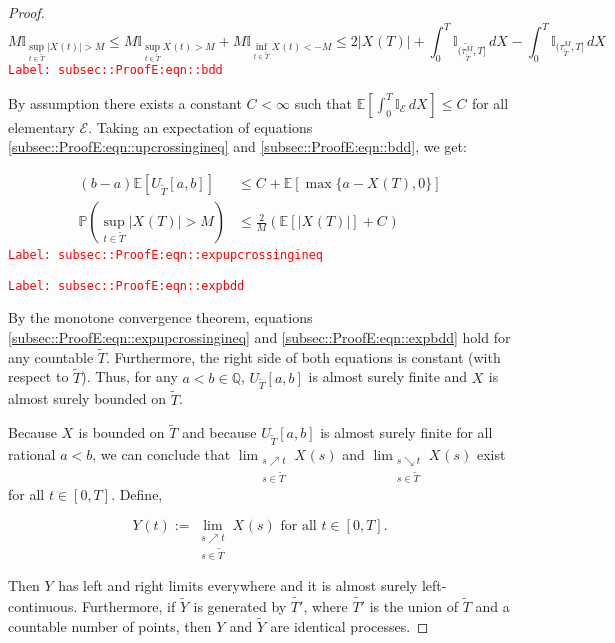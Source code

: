 \documentclass[12pt]{article}
\newcommand{\mb}{\mathbb}
\newcommand{\mc}{\mathcal}
\newcommand{\te}{\text}
\newcommand{\tr}{\textcolor{red}}
\newcommand{\labe}[1]{\tr{\texttt{Label: #1}}}
\newcommand{\ind}{\hspace{24pt}}
\newcommand{\pr}{\mb{P}}							%
\newcommand{\ex}[1]{\mb{E}\left[#1\right]}			%
\newcommand{\T}{T}								%
\renewcommand{\t}{t}							%
\renewcommand{\tt}{s}								%
\newcommand{\rt}[1]{\tau^{#1}}						%
\newcommand{\rxvt}[2]{X_{#1}{(#2)}}					%
\newcommand{\rxvtt}[2]{Y_{#1}{(#2)}}				%
\newcommand{\rxvts}[2]{X_{#1}{#2}}					%
\newcommand{\rxvtts}[2]{Y_{#1}{#2}}					%
\newcommand{\const}[1]{C_{#1}}						%
\newcommand{\alt}{\widetilde}						%
\newcommand{\evnt}{\mc{E}}						%
\begin{document}
\begin{proof}
\begin{equation}
M\mb{I}_{\sup_{\t\in\alt{T}}|\rxvt{}{\t}| > M} \leq M\mb{I}_{\sup_{\t\in\alt{T}}\rxvt{}{\t} > M} + M\mb{I}_{\inf_{\t\in\alt{T}}\rxvt{}{\t} < -M} \leq 2|\rxvt{}{\T}| + \int_0^\T \mb{I}_{(\alt{\rt{M}_{\alt{T}}},\T]}\,d\rxvts{}{} - \int_0^\T \mb{I}_{(\rt{M}_{\alt{T}},\T]}\,d\rxvts{}{}
\label{subsec::ProofE:eqn::bdd}
\end{equation}
\labe{subsec::ProofE:eqn::bdd}

By assumption there exists a constant \(\const{} < \infty\) such that \(\ex{\int_0^\T \mb{I}_{\evnt}\,d\rxvts{}{}} \leq \const{}\) for all elementary \(\evnt\). Taking an expectation of equations \eqref{subsec::ProofE:eqn::upcrossingineq} and \eqref{subsec::ProofE:eqn::bdd}, we get:

\begin{align}
(b-a)\ex{U_{\alt{T}}[a,b]} &\leq \const{} + \ex{\max\{a-\rxvt{}{\T},0\}}
\label{subsec::ProofE:eqn::expupcrossingineq}\\
\pr\left(\sup_{\t\in\alt{T}} |\rxvt{}{\T}| > M\right) &\leq \frac{2}{M}\left(\ex{|\rxvt{}{\T}|} + \const{}\right)
\label{subsec::ProofE:eqn::expbdd}
\end{align}
\labe{subsec::ProofE:eqn::expupcrossingineq}

\labe{subsec::ProofE:eqn::expbdd}

By the monotone convergence theorem, equations \eqref{subsec::ProofE:eqn::expupcrossingineq} and \eqref{subsec::ProofE:eqn::expbdd} hold for any countable \(\alt{T}\). Furthermore, the right side of both equations is constant (with respect to \(\alt{T}\)). Thus, for any \(a < b \in \mb{Q}\), \(U_{\alt{T}}[a,b]\) is almost surely finite and \(\rxvts{}{}\) is almost surely bounded on \(\alt{T}\).

\ind Because \(\rxvts{}{}\) is bounded on \(\alt{T}\) and because \(U_{\alt{T}}[a,b]\) is almost surely finite for all rational \(a < b\), we can conclude that \(\lim_{\substack{\tt \nearrow \t\\ \tt \in \alt{T}}} \rxvt{}{\tt}\) and \(\lim_{\substack{\tt \searrow \t\\ \tt \in \alt{T}}} \rxvt{}{\tt}\) exist for all \(\t \in [0,\T]\). Define,

\[\rxvtt{}{\t} := \lim_{\substack{\tt \nearrow \t\\\tt \in \alt{T}}} \rxvt{}{\tt}\te{ for all } \t \in [0,\T].\]

Then \(\rxvtts{}{}\) has left and right limits everywhere and it is almost surely left-continuous. Furthermore, if \(\alt{\rxvtts{}{}}\) is generated by \(\alt{T'}\), where \(\alt{T'}\) is the union of \(\alt{T}\) and a countable number of points, then \(\rxvtts{}{}\) and \(\alt{\rxvtts{}{}}\) are identical processes. 


\end{proof}
\end{document}
